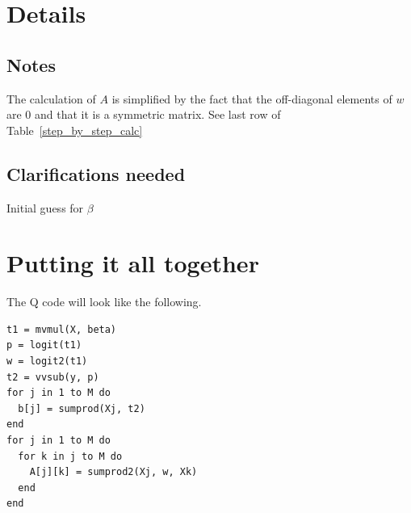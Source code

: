\documentclass[12pt,timesnewroman,letterpaper]{article}
\begin{document}
\section{Details}

\subsection{Notes}

\be
\item The calculation of \(A\) is simplified by the fact that the off-diagonal
  elements of \(w\) are 0 and that it is a symmetric matrix. See last row of
  Table~\ref{step_by_step_calc}
\ee
\subsection{Clarifications needed}

\be
\item Initial guess for \(\beta\)
\ee

\section{Putting it all together}
The Q code will look like the following.

\begin{verbatim}
t1 = mvmul(X, beta)  
p = logit(t1)
w = logit2(t1)
t2 = vvsub(y, p)
for j in 1 to M do 
  b[j] = sumprod(Xj, t2)
end
for j in 1 to M do 
  for k in j to M do 
    A[j][k] = sumprod2(Xj, w, Xk)
  end
end
\end{verbatim}
\end{document}
